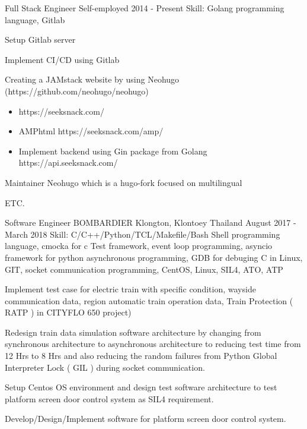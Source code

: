 \begin{cventries}
  \cventry
    {Full Stack Engineer} %
    {Self-employed} %
    {} %
    {2014 - Present} %
    {Skill: Golang programming language, Gitlab} %
    {
      \begin{cvitems} %
        \item {Setup Gitlab server}
        \item {Implement CI/CD using Gitlab}
        \item {Creating a JAMstack website by using Neohugo
              (https://github.com/neohugo/neohugo) }
         \begin{itemize}
           \item https://seeksnack.com/
           \item AMPhtml https://seeksnack.com/amp/
           \item Implement backend using Gin package from Golang
             https://api.seeksnack.com/
         \end{itemize}
        \item {Maintainer Neohugo which is a hugo-fork focused on multilingual}
        \item {ETC.}
      \end{cvitems}
    }

  \cventry
    {Software Engineer} %
    {BOMBARDIER} %
    {Klongton, Klontoey Thailand} %
    {August 2017 - March 2018} %
    {Skill: C/C++/Python/TCL/Makefile/Bash Shell programming language, cmocka
    for c Test framework, event loop programming,
    asyncio framework for python asynchronous programming,
    GDB for debuging C in Linux, GIT, socket communication
    programming, CentOS, Linux, SIL4, ATO, ATP } %
    {
      \begin{cvitems} %
       \item {Implement test case for electric train with specific condition,
         wayside communication data, region automatic train operation data,
          Train Protection ( RATP ) in CITYFLO 650 project)}
       \item {Redesign train data simulation software architecture by changing
          from synchronous architecture to asynchronous architecture to reducing test
          time from 12 Hrs to 8 Hrs and also reducing the random failures from
          Python Global Interpreter Lock ( GIL ) during socket communication.}
       \item {Setup Centos OS environment and design test software architecture
       to test platform screen door control system as SIL4 requirement.}
       \item {Develop/Design/Implement software for platform screen door control
         system.}
      \end{cvitems}
    }


\end{cventries}
